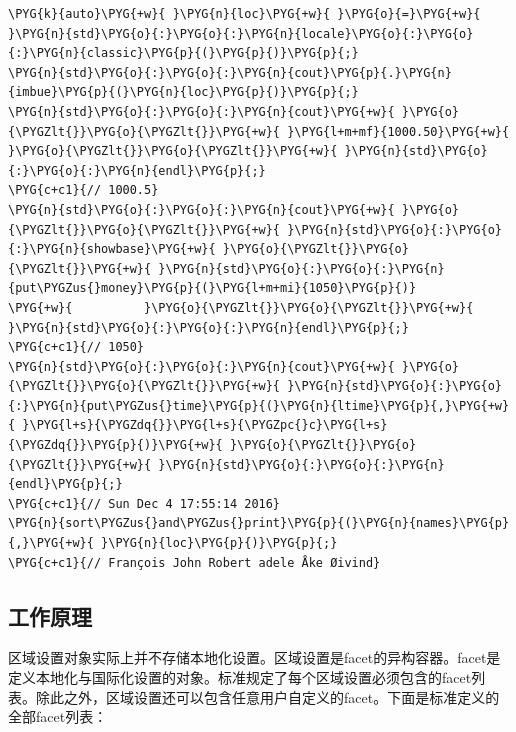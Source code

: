 \begin{itemize}
\begin{codeblockbg}
\begin{Verbatim}[commandchars=\\\{\},breaklines=true,breakanywhere=true,fontsize=\codefont,xleftmargin=17bp]
\PYG{k}{auto}\PYG{+w}{ }\PYG{n}{loc}\PYG{+w}{ }\PYG{o}{=}\PYG{+w}{ }\PYG{n}{std}\PYG{o}{:}\PYG{o}{:}\PYG{n}{locale}\PYG{o}{:}\PYG{o}{:}\PYG{n}{classic}\PYG{p}{(}\PYG{p}{)}\PYG{p}{;}
\PYG{n}{std}\PYG{o}{:}\PYG{o}{:}\PYG{n}{cout}\PYG{p}{.}\PYG{n}{imbue}\PYG{p}{(}\PYG{n}{loc}\PYG{p}{)}\PYG{p}{;}
\PYG{n}{std}\PYG{o}{:}\PYG{o}{:}\PYG{n}{cout}\PYG{+w}{ }\PYG{o}{\PYGZlt{}}\PYG{o}{\PYGZlt{}}\PYG{+w}{ }\PYG{l+m+mf}{1000.50}\PYG{+w}{ }\PYG{o}{\PYGZlt{}}\PYG{o}{\PYGZlt{}}\PYG{+w}{ }\PYG{n}{std}\PYG{o}{:}\PYG{o}{:}\PYG{n}{endl}\PYG{p}{;}
\PYG{c+c1}{// 1000.5}
\PYG{n}{std}\PYG{o}{:}\PYG{o}{:}\PYG{n}{cout}\PYG{+w}{ }\PYG{o}{\PYGZlt{}}\PYG{o}{\PYGZlt{}}\PYG{+w}{ }\PYG{n}{std}\PYG{o}{:}\PYG{o}{:}\PYG{n}{showbase}\PYG{+w}{ }\PYG{o}{\PYGZlt{}}\PYG{o}{\PYGZlt{}}\PYG{+w}{ }\PYG{n}{std}\PYG{o}{:}\PYG{o}{:}\PYG{n}{put\PYGZus{}money}\PYG{p}{(}\PYG{l+m+mi}{1050}\PYG{p}{)}
\PYG{+w}{          }\PYG{o}{\PYGZlt{}}\PYG{o}{\PYGZlt{}}\PYG{+w}{ }\PYG{n}{std}\PYG{o}{:}\PYG{o}{:}\PYG{n}{endl}\PYG{p}{;}
\PYG{c+c1}{// 1050}
\PYG{n}{std}\PYG{o}{:}\PYG{o}{:}\PYG{n}{cout}\PYG{+w}{ }\PYG{o}{\PYGZlt{}}\PYG{o}{\PYGZlt{}}\PYG{+w}{ }\PYG{n}{std}\PYG{o}{:}\PYG{o}{:}\PYG{n}{put\PYGZus{}time}\PYG{p}{(}\PYG{n}{ltime}\PYG{p}{,}\PYG{+w}{ }\PYG{l+s}{\PYGZdq{}}\PYG{l+s}{\PYGZpc{}c}\PYG{l+s}{\PYGZdq{}}\PYG{p}{)}\PYG{+w}{ }\PYG{o}{\PYGZlt{}}\PYG{o}{\PYGZlt{}}\PYG{+w}{ }\PYG{n}{std}\PYG{o}{:}\PYG{o}{:}\PYG{n}{endl}\PYG{p}{;}
\PYG{c+c1}{// Sun Dec 4 17:55:14 2016}
\PYG{n}{sort\PYGZus{}and\PYGZus{}print}\PYG{p}{(}\PYG{n}{names}\PYG{p}{,}\PYG{+w}{ }\PYG{n}{loc}\PYG{p}{)}\PYG{p}{;}
\PYG{c+c1}{// François John Robert adele Åke Øivind}
\end{Verbatim}
\end{codeblockbg}

\end{itemize}



\subsection{工作原理}



区域设置对象实际上并不存储本地化设置。区域设置是facet的异构容器。facet是定义本地化与国际化设置的对象。标准规定了每个区域设置必须包含的facet列表。除此之外，区域设置还可以包含任意用户自定义的facet。下面是标准定义的全部facet列表：


